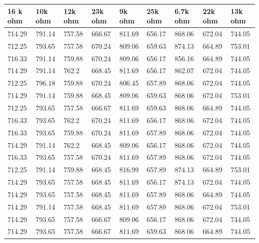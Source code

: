 	\begin{longtable}{|l|l|l|l|l|l|l|l|l|}

		\hline
		16 k ohm & 10k ohm & 12k ohm & 23k ohm & 9k ohm & 25k ohm & 6.7k ohm & 22k ohm & 13k ohm \\ \hline
		714.29   & 791.14  & 757.58  & 666.67  & 811.69 & 656.17  & 868.06   & 672.04  & 744.05  \\ \hline
		712.25   & 793.65  & 757.58  & 670.24  & 809.06 & 659.63  & 874.13   & 664.89  & 753.01  \\ \hline
		716.33   & 791.14  & 759.88  & 670.24  & 809.06 & 656.17  & 856.16   & 664.89  & 744.05  \\ \hline
		714.29   & 791.14  & 762.2   & 668.45  & 811.69 & 656.17  & 862.07   & 672.04  & 744.05  \\ \hline
		712.25   & 796.18  & 759.88  & 670.24  & 806.45 & 657.89  & 868.06   & 672.04  & 744.05  \\ \hline
		714.29   & 791.14  & 759.88  & 668.45  & 809.06 & 659.63  & 868.06   & 672.04  & 753.01  \\ \hline
		712.25   & 793.65  & 757.58  & 666.67  & 811.69 & 659.63  & 868.06   & 664.89  & 744.05  \\ \hline
		716.33   & 793.65  & 762.2   & 670.24  & 811.69 & 656.17  & 868.06   & 672.04  & 744.05  \\ \hline
		716.33   & 793.65  & 759.88  & 670.24  & 811.69 & 657.89  & 868.06   & 672.04  & 744.05  \\ \hline
		714.29   & 791.14  & 762.2   & 668.45  & 809.06 & 656.17  & 868.06   & 672.04  & 744.05  \\ \hline
		716.33   & 793.65  & 757.58  & 670.24  & 811.69 & 657.89  & 868.06   & 672.04  & 744.05  \\ \hline
		712.25   & 791.14  & 759.88  & 668.45  & 816.99 & 657.89  & 874.13   & 664.89  & 753.01  \\ \hline
		714.29   & 793.65  & 757.58  & 668.45  & 811.69 & 656.17  & 874.13   & 672.04  & 744.05  \\ \hline
		714.29   & 793.65  & 757.58  & 668.45  & 811.69 & 657.89  & 868.06   & 664.89  & 744.05  \\ \hline
		714.29   & 791.14  & 757.58  & 668.45  & 811.69 & 657.89  & 868.06   & 672.04  & 753.01  \\ \hline
		714.29   & 793.65  & 757.58  & 666.67  & 809.06 & 656.17  & 868.06   & 672.04  & 744.05  \\ \hline
		714.29   & 793.65  & 757.58  & 666.67  & 811.69 & 659.63  & 868.06   & 664.89  & 744.05  \\ \hline

\end{longtable}
